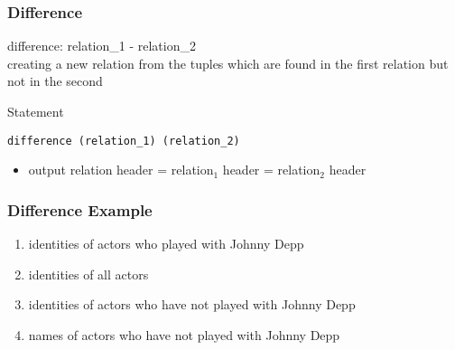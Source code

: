 \documentclass[dvipsnames]{beamer}
\theoremstyle{plain}
\begin{document}
\begin{frame}[fragile]
  \frametitle{Difference}

  \begin{definition}
    \alert{difference}: relation\_1 - relation\_2\\
      creating a new relation from the tuples which are found in the first
      relation but not in the second
  \end{definition}

  \pause
  \begin{block}{Statement}
    \begin{lstlisting}
difference (relation_1) (relation_2)
    \end{lstlisting}
  \end{block}

  \pause
  \begin{itemize}
    \item output relation header = relation$_1$ header = relation$_2$ header
  \end{itemize}
\end{frame}

\begin{frame}
  \frametitle{Difference Example}

  \begin{example}
    \pause
    \begin{enumerate}
      \item identities of actors who played with Johnny Depp

      \pause
      \item identities of all actors

      \pause
      \item identities of actors who have not played with Johnny Depp

      \pause
      \item names of actors who have not played with Johnny Depp
    \end{enumerate}
  \end{example}
\end{frame}
\end{document}
